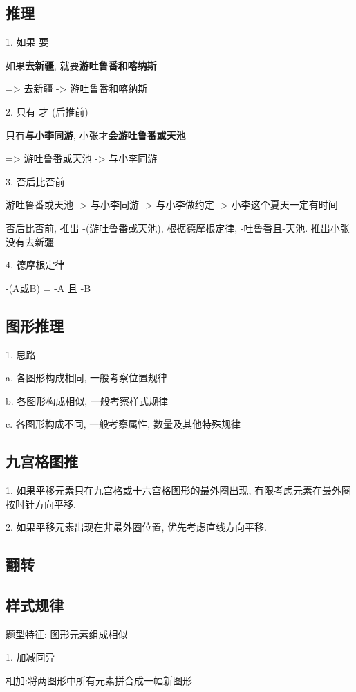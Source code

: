 \documentclass[UTF8]{ctexart}
\begin{document}
\subsection{推理}

1. 如果    要

如果\textbf{去新疆}, 就要\textbf{游吐鲁番和喀纳斯}

=> 去新疆 -> 游吐鲁番和喀纳斯

2. 只有   才 (后推前)

只有\textbf{与小李同游}, 小张才\textbf{会游吐鲁番或天池}

=> 游吐鲁番或天池 -> 与小李同游

3. 否后比否前


游吐鲁番或天池 -> 与小李同游 -> 与小李做约定 -> 小李这个夏天一定有时间

否后比否前, 推出 -(游吐鲁番或天池), 根据德摩根定律, -吐鲁番且-天池. 推出小张没有去新疆

4. 德摩根定律

-(A或B) = -A 且 -B

\subsection{图形推理}

1. 思路

a. 各图形构成相同, 一般考察位置规律

b. 各图形构成相似, 一般考察样式规律

c. 各图形构成不同, 一般考察属性, 数量及其他特殊规律

\subsection{九宫格图推}
1. 如果平移元素只在九宫格或十六宫格图形的最外圈出现, 有限考虑元素在最外圈按时针方向平移.

2. 如果平移元素出现在非最外圈位置, 优先考虑直线方向平移.

\subsection{翻转}

\subsection{样式规律}
题型特征: 图形元素组成相似

1. 加减同异

相加:将两图形中所有元素拼合成一幅新图形
\end{document}
